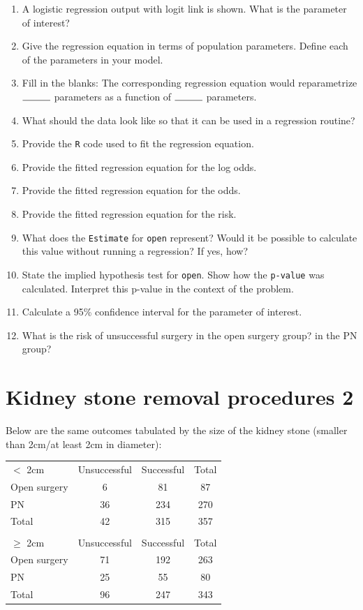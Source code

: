 \documentclass[landscape,twocolumn,letterpaper,9pt,reqno]{article}\usepackage[]{graphicx}\usepackage[]{color}
\newcommand{\compresslist}{ %
	\setlength{\itemsep}{1pt}
	\setlength{\parskip}{0pt}
	\setlength{\parsep}{0pt}
}
\begin{document}
\begin{enumerate}\compresslist
	\item A logistic regression output with logit link is shown. What is the parameter of interest?
	\item Give the regression equation in terms of population parameters. Define each of the parameters in your model.
	\item Fill in the blanks: The corresponding regression equation would reparametrize $\rule{1cm}{0.15mm}$ parameters as a function of $\rule{1cm}{0.15mm}$ parameters.
	\item What should the data look like so that it can be used in a regression routine?
	\item Provide the \texttt{R} code used to fit the regression equation.
	\item Provide the fitted regression equation for the log odds. 
	\item Provide the fitted regression equation for the odds. 
	\item Provide the fitted regression equation for the risk. 
	\item What does the \texttt{Estimate} for \texttt{open} represent? Would it be possible to calculate this value without running a regression? If yes, how?
	\item State the implied hypothesis test for \texttt{open}. Show how the \texttt{p-value} was calculated. Interpret this p-value in the context of the problem. 
	\item Calculate a 95\% confidence interval for the parameter of interest. 
	\item What is the risk of unsuccessful surgery in the open surgery group? in the PN group?
\end{enumerate}



\clearpage

\section{Kidney stone removal procedures 2}
Below are the same outcomes tabulated by the size of the kidney stone (smaller than 2cm/at least 2cm in diameter):

\begin{table}[h]
	\centering
	\begin{tabular}{lcc|c}
		$<$ 2cm & Unsuccessful &  Successful & Total\\
		Open surgery & 6 & 81 & 87 \\
		PN 			 & 36 & 234 & 270 \\
		\hline
		Total 	& 42 & 315 & 357 \\
		& & &  \\
		$\geq$ 2cm & Unsuccessful &  Successful & Total\\
		Open surgery & 71 & 192 & 263 \\
		PN 			 & 25 & 55 & 80 \\
		\hline
		Total 		& 96 & 247 & 343
	\end{tabular}
\end{table}
\end{document}
